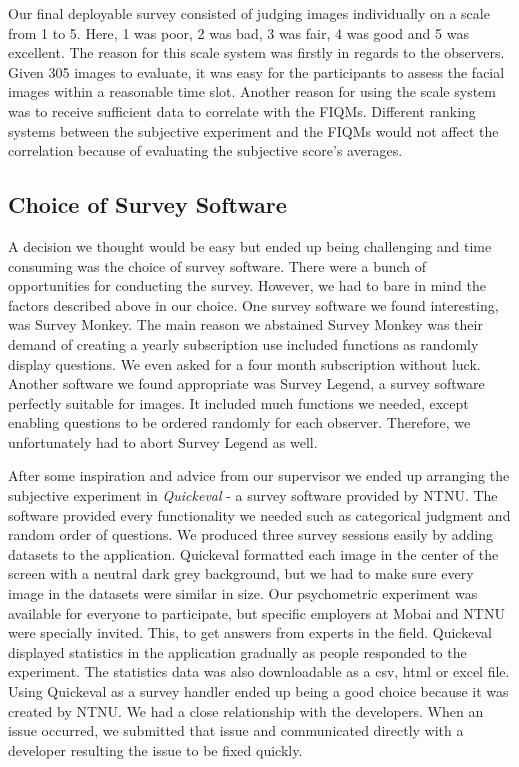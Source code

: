 Our final deployable survey consisted of judging images individually on a scale from 1 to 5. Here, 1 was poor, 2 was bad, 3 was fair, 4 was good and 5 was excellent. The reason for this scale system was firstly in regards to the observers. Given 305 images to evaluate, it was easy for the participants to assess the facial images within a reasonable time slot. Another reason for using the scale system was to receive sufficient data to correlate with the FIQMs. Different ranking systems between the subjective experiment and the FIQMs would not affect the correlation because of evaluating the subjective score's averages.

\subsection*{Choice of Survey Software}
\label{subsection:choicesoftware}
A decision we thought would be easy but ended up being challenging and time consuming was the choice of survey software. There were a bunch of opportunities for conducting the survey. However, we had to bare in mind the factors described above in our choice. One survey software we found interesting, was Survey Monkey. The main reason we abstained Survey Monkey was their demand of creating a yearly subscription use included functions as randomly display questions. We even asked for a four month subscription without luck. Another software we found appropriate was Survey Legend, a survey software perfectly suitable for images. It included much functions we needed, except enabling questions to be ordered randomly for each observer. Therefore, we unfortunately had to abort Survey Legend as well. 

After some inspiration and advice from our supervisor we ended up arranging the subjective experiment in \textit{Quickeval} - a survey software provided by NTNU. The software provided every functionality we needed such as categorical judgment and random order of questions. We produced three survey sessions easily by adding datasets to the application. Quickeval formatted each image in the center of the screen with a neutral dark grey background, but we had to make sure every image in the datasets were similar in size. Our psychometric experiment was available for everyone to participate, but specific employers at Mobai and NTNU were specially invited. This, to get answers from experts in the field. Quickeval displayed statistics in the application gradually as people responded to the experiment. The statistics data was also downloadable as a csv, html or excel file. 
Using Quickeval as a survey handler ended up being a good choice because it was created by NTNU. We had a close relationship with the developers. When an issue occurred, we submitted that issue and communicated directly with a developer resulting the issue to be fixed quickly. 

